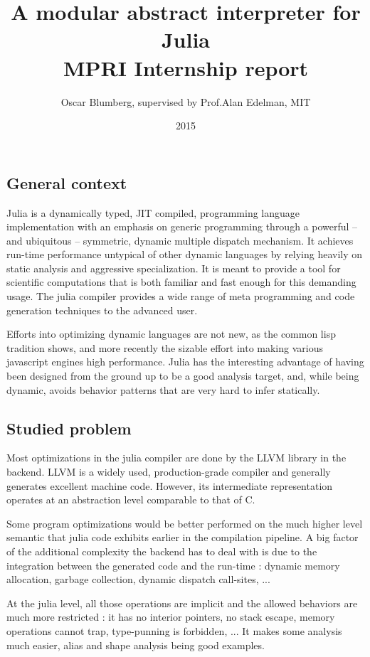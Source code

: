 \documentclass[14pt]{article}
\title{\vspace{-5ex}A modular abstract interpreter for Julia \\ MPRI Internship report}
\author{Oscar Blumberg, supervised by Prof.\@ Alan Edelman, MIT}
\date{2015}
\begin{document}
\onehalfspacing
\maketitle
\thispagestyle{empty}
\vspace{2ex}
\subsection*{General context}

Julia is a dynamically typed, JIT compiled, programming language implementation with an emphasis on generic programming through a powerful -- and ubiquitous -- symmetric, dynamic multiple dispatch mechanism. It achieves run-time performance untypical of other dynamic languages by relying heavily on static analysis and aggressive specialization. It is meant to provide a tool for scientific computations that is both familiar and fast enough for this demanding usage. The julia compiler provides a wide range of meta programming and code generation techniques to the advanced user.

Efforts into optimizing dynamic languages are not new, as the common lisp tradition shows, and more recently the sizable effort into making various javascript engines high performance. Julia has the interesting advantage of having been designed from the ground up to be a good analysis target, and, while being dynamic, avoids behavior patterns that are very hard to infer statically.

\subsection*{Studied problem}

Most optimizations in the julia compiler are done by the LLVM library in the backend. LLVM is a widely used, production-grade compiler and generally generates excellent machine code. However, its intermediate representation operates at an abstraction level comparable to that of C.

Some program optimizations would be better performed on the much higher level semantic that julia code exhibits earlier in the compilation pipeline. A big factor of the additional complexity the backend has to deal with is due to the integration between the generated code and the run-time : dynamic memory allocation, garbage collection, dynamic dispatch call-sites, ...

At the julia level, all those operations are implicit and the allowed behaviors are much more restricted : it has no interior pointers, no stack escape, memory operations cannot trap, type-punning is forbidden, ... It makes some analysis much easier, alias and shape analysis being good examples.
\end{document}
